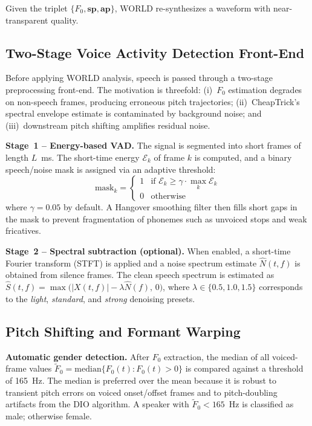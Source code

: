 \documentclass[conference]{IEEEtran}
\begin{document}
Given the triplet $\{F_0, \mathbf{sp}, \mathbf{ap}\}$, WORLD
re-synthesizes a waveform with near-transparent quality.

\subsection{Two-Stage Voice Activity Detection Front-End}
\label{sec:vad}

Before applying WORLD analysis, speech is passed through a two-stage
preprocessing front-end.  The motivation is threefold: (i)~$F_0$
estimation degrades on non-speech frames, producing erroneous pitch
trajectories; (ii)~CheapTrick's spectral envelope estimate is
contaminated by background noise; and (iii)~downstream pitch shifting
amplifies residual noise.

\textbf{Stage~1 -- Energy-based VAD.}
The signal is segmented into short frames of length $L$~ms.
The short-time energy $\mathcal{E}_k$ of frame $k$ is computed, and a
binary speech/noise mask is assigned via an adaptive threshold:
\begin{equation}
  \text{mask}_k =
  \begin{cases}
    1 & \text{if } \mathcal{E}_k \geq \gamma \cdot \max_k \mathcal{E}_k \\
    0 & \text{otherwise}
  \end{cases}
  \label{eq:vad}
\end{equation}
where $\gamma = 0.05$ by default.  A Hangover smoothing filter then
fills short gaps in the mask to prevent fragmentation of phonemes such
as unvoiced stops and weak fricatives.

\textbf{Stage~2 -- Spectral subtraction (optional).}
When enabled, a short-time Fourier transform (STFT) is applied and a
noise spectrum estimate $\hat{N}(t,f)$ is obtained from silence frames.
The clean speech spectrum is estimated as
$\hat{S}(t,f) = \max\bigl(|X(t,f)| - \lambda\hat{N}(f),\, 0\bigr)$,
where $\lambda\in\{0.5,1.0,1.5\}$ corresponds to the \textit{light},
\textit{standard}, and \textit{strong} denoising presets.

\subsection{Pitch Shifting and Formant Warping}

\textbf{Automatic gender detection.}
After $F_0$ extraction, the median of all voiced-frame values
$\tilde{F}_0 = \mathrm{median}\{F_0(t): F_0(t)>0\}$
is compared against a threshold of 165~Hz.
The median is preferred over the mean because it is robust to
transient pitch errors on voiced onset/offset frames and to
pitch-doubling artifacts from the DIO algorithm.
A speaker with $\tilde{F}_0 < 165$~Hz is classified as male;
otherwise female.
\end{document}
